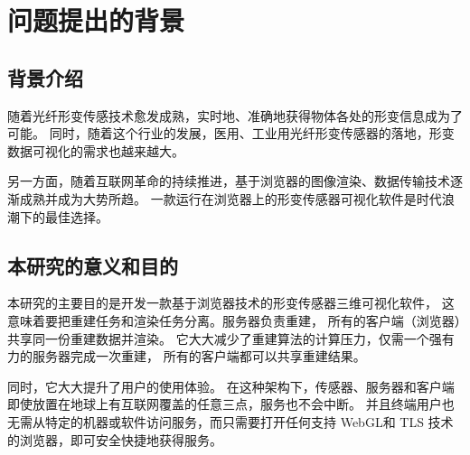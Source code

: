 \section{问题提出的背景}
\subsection{背景介绍}

随着光纤形变传感技术愈发成熟，实时地、准确地获得物体各处的形变信息成为了可能。
同时，随着这个行业的发展，医用、工业用光纤形变传感器的落地，形变数据可视化的需求也越来越大。

另一方面，随着互联网革命的持续推进，基于浏览器的图像渲染、数据传输技术逐渐成熟并成为大势所趋。
一款运行在浏览器上的形变传感器可视化软件是时代浪潮下的最佳选择。

\subsection{本研究的意义和目的}

本研究的主要目的是开发一款基于浏览器技术的形变传感器三维可视化软件，
这意味着要把重建任务和渲染任务分离。服务器负责重建，
所有的客户端（浏览器）共享同一份重建数据并渲染。
它大大减少了重建算法的计算压力，仅需一个强有力的服务器完成一次重建，
所有的客户端都可以共享重建结果。

同时，它大大提升了用户的使用体验。
在这种架构下，传感器、服务器和客户端即使放置在地球上有互联网覆盖的任意三点，服务也不会中断。
并且终端用户也无需从特定的机器或软件访问服务，而只需要打开任何支持 WebGL和 TLS 技术的浏览器，即可安全快捷地获得服务。